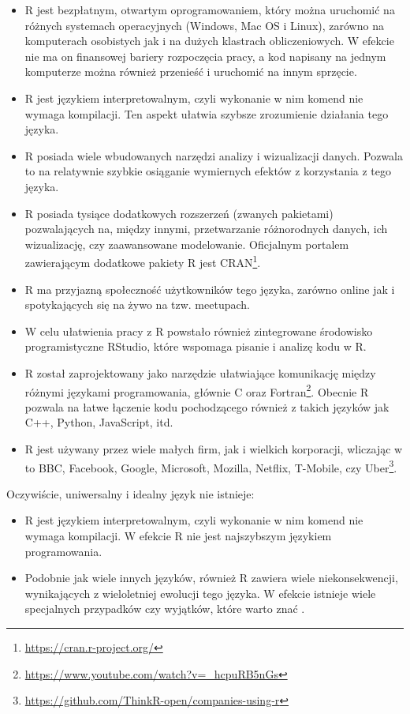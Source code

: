 \documentclass[paper=6in:9in,pagesize=pdftex,headinclude=on,footinclude=on,10pt]{scrbook}
\DeclareRobustCommand{\href}[2]{#2\footnote{\url{#1}}}
\providecommand{\tightlist}{%
  \setlength{\itemsep}{0pt}\setlength{\parskip}{0pt}}
\begin{document}
\begin{itemize}
\tightlist
\item
  R jest bezpłatnym, otwartym oprogramowaniem, który można uruchomić na różnych systemach operacyjnych (Windows, Mac OS i Linux), zarówno na komputerach osobistych jak i na dużych klastrach obliczeniowych.
  W efekcie nie ma on finansowej bariery rozpoczęcia pracy, a kod napisany na jednym komputerze można również przenieść i uruchomić na innym sprzęcie.
\item
  R jest językiem interpretowalnym, czyli wykonanie w nim komend nie wymaga kompilacji.
  Ten aspekt ułatwia szybsze zrozumienie działania tego języka.
\item
  R posiada wiele wbudowanych narzędzi analizy i wizualizacji danych.
  Pozwala to na relatywnie szybkie osiąganie wymiernych efektów z korzystania z tego języka.
\item
  R posiada tysiące dodatkowych rozszerzeń (zwanych pakietami) pozwalających na, między innymi, przetwarzanie różnorodnych danych, ich wizualizację, czy zaawansowane modelowanie.
  Oficjalnym portalem zawierającym dodatkowe pakiety R jest \href{https://cran.r-project.org/}{CRAN}.
\item
  R ma przyjazną społeczność użytkowników tego języka, zarówno online jak i spotykających się na żywo na tzw. meetupach.
\item
  W celu ułatwienia pracy z R powstało również zintegrowane środowisko programistyczne RStudio, które wspomaga pisanie i analizę kodu w R.
\item
  R został zaprojektowany jako narzędzie ułatwiające komunikację między różnymi językami programowania, głównie C oraz Fortran\footnote{\url{https://www.youtube.com/watch?v=_hcpuRB5nGs}}.
  Obecnie R pozwala na łatwe łączenie kodu pochodzącego również z takich języków jak C++, Python, JavaScript, itd.
\item
  R jest używany przez wiele małych firm, jak i wielkich korporacji, wliczając w to BBC, Facebook, Google, Microsoft, Mozilla, Netflix, T-Mobile, czy Uber\footnote{\url{https://github.com/ThinkR-open/companies-using-r}}.
\end{itemize}

Oczywiście, uniwersalny i idealny język nie istnieje:

\begin{itemize}
\tightlist
\item
  R jest językiem interpretowalnym, czyli wykonanie w nim komend nie wymaga kompilacji.
  W efekcie R nie jest najszybszym językiem programowania.
\item
  Podobnie jak wiele innych języków, również R zawiera wiele niekonsekwencji, wynikających z wieloletniej ewolucji tego języka.
  W efekcie istnieje wiele specjalnych przypadków czy wyjątków, które warto znać \citep{burns2012r}.
\end{itemize}
\end{document}
